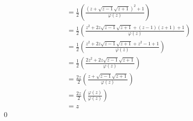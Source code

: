 \documentclass[10pt]{amsart}
\theoremstyle{nonumberplain}
\begin{document}
\begin{enumerate}[label={\bf {\arabic*}:}]
\begin{align*}
   &= \frac{1}{2}\left(\frac{(z + \sqrt{z - 1}\sqrt{z + 1})^2 + 1}{\varphi(z)}\right) \\
   &= \frac{1}{2}\left(\frac{z^2 + 2 z \sqrt{z - 1}\sqrt{z + 1} + (z - 1)(z + 1) + 1}{\varphi(z)}\right) \\
   &= \frac{1}{2}\left(\frac{z^2 + 2 z \sqrt{z - 1}\sqrt{z + 1} + z^2 - 1 + 1}{\varphi(z)}\right) \\
   &= \frac{1}{2}\left(\frac{2z^2 + 2 z \sqrt{z - 1}\sqrt{z + 1}}{\varphi(z)}\right) \\
   &= \frac{2z}{2}\left(\frac{z + \sqrt{z - 1}\sqrt{z + 1}}{\varphi(z)}\right) \\
   &= \frac{2z}{2}\left(\frac{\varphi(z)}{\varphi(z)}\right) \\
   &= z
\end{align*}
\qed
\\


\end{enumerate}
\end{document}
